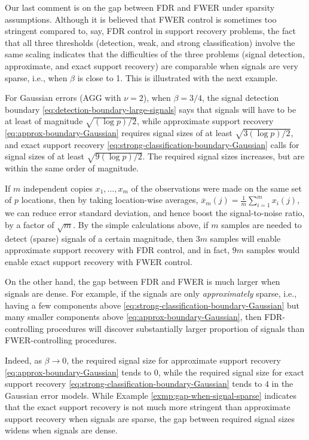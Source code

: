 \medskip

Our last comment is on the gap between FDR and FWER under sparsity assumptions. 
Although it is believed that FWER control is sometimes too stringent compared to, say, FDR control in support recovery problems, the fact that all three thresholds (detection, weak, and strong classification) involve the same scaling indicates that the difficulties of the three problems (signal detection, approximate, and exact support recovery) are comparable when signals are very sparse, i.e., when $\beta$ is close to 1.
This is illustrated with the next example.

\begin{example} \label{exmp:gap-when-signal-sparse}
For Gaussian errors (AGG with $\nu = 2$), when $\beta = 3/4$, the signal detection boundary \eqref{eq:detection-boundary-large-signals} says that signals will have to be at least of magnitude $\sqrt{(\log{p})/2}$, 
while approximate support recovery \eqref{eq:approx-boundary-Gaussian} requires signal sizes of at least $\sqrt{3(\log{p})/2}$, 
and exact support recovery \eqref{eq:strong-classification-boundary-Gaussian} calls for signal sizes of at least $\sqrt{9(\log{p})/2}$. 
The required signal sizes increases, but are within the same order of magnitude.

If $m$ independent copies $x_1,\ldots,x_m$ of the observations were made on the same set of $p$ locations, then by taking location-wise averages, $\overline{x}_{m}(j) = \frac{1}{m}\sum_{i=1}^{m} x_i(j)$,
we can reduce error standard deviation, and hence boost the signal-to-noise ratio, by a factor of $\sqrt{m}$.
By the simple calculations above, if $m$ samples are needed to detect (sparse) signals of a certain magnitude, then $3m$ samples will enable approximate support recovery with FDR control, and in fact, $9m$ samples would enable exact support recovery with FWER control.
\end{example}

On the other hand, the gap between FDR and FWER is much larger when signals are dense.
For example, if the signals are only \emph{approximately} sparse, i.e., having a few components above \eqref{eq:strong-classification-boundary-Gaussian} but many smaller components above  \eqref{eq:approx-boundary-Gaussian}, then FDR-controlling procedures will discover substantially larger proportion of signals than FWER-controlling procedures.

Indeed, as $\beta\to0$, the required signal size for approximate support recovery \eqref{eq:approx-boundary-Gaussian} tends to 0, while the required signal size for exact support recovery \eqref{eq:strong-classification-boundary-Gaussian} tends to $4$ in the Gaussian error models.
While Example \ref{exmp:gap-when-signal-sparse} indicates that the exact support recovery is not much more stringent than approximate support recovery when signals are sparse, the gap between required signal sizes widens when signals are dense. 

